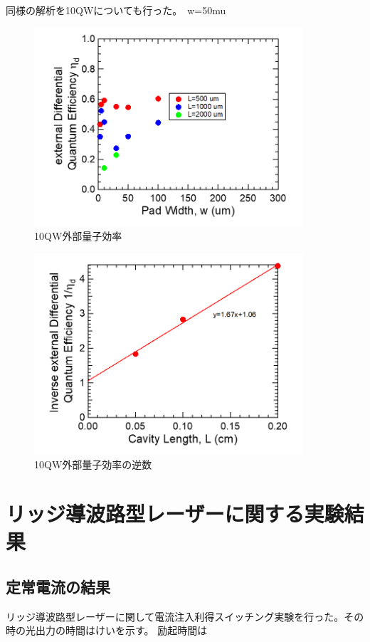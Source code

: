 同様の解析を10QWについても行った。　w=50mu
\begin{figure}[h]
	\centering
	\includegraphics[width=10cm]{figure/fig_3_1_10QW_broadcontact_id.png}
	\caption{10QW外部量子効率}
	\label{fig:fig_3_1_10QW_broadcontact_id}
\end{figure}

\begin{figure}[h]
	\centering
	\includegraphics[width=10cm]{figure/fig_3_1_10QW_broadcontact_id_inverse.png}
	\caption{10QW外部量子効率の逆数}
	\label{fig:fig_3_1_10QW_broadcontact_id_inverse}
\end{figure}


\clearpage
\section{リッジ導波路型レーザーに関する実験結果}%
\subsection{定常電流の結果}
リッジ導波路型レーザーに関して電流注入利得スイッチング実験を行った。その時の光出力の時間はけいを示す。
励起時間は
